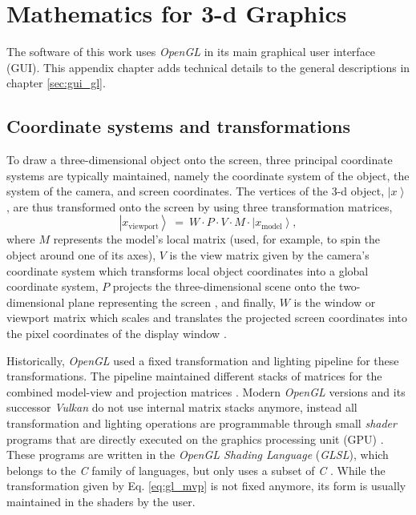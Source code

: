 %
%

\chapter{Mathematics for 3-d Graphics}
\label{ch:gl}

The software of this work uses \textit{OpenGL} \cite{web_OpenGL} in its main graphical user interface (GUI).
This appendix chapter adds technical details to the general descriptions in chapter \ref{sec:gui_gl}.



\section{Coordinate systems and transformations}

To draw a three-dimensional object onto the screen, three principal coordinate systems are typically maintained,
namely the coordinate system of the object, the system of the camera, and screen coordinates.
The vertices of the 3-d object, $\left|x\right>$ , are thus transformed onto the screen by using three
transformation matrices,
\begin{equation}
	\boxed{\left|x_{\mathrm{viewport}}\right> \ =\ W \cdot P \cdot V \cdot  M \cdot  \left| x_{\mathrm{model}} \right>,}
	\label{eq:gl_mvp}
\end{equation}
where $M$ represents the model's local matrix (used, for example, to spin the object around one of its axes),
$V$ is the view matrix given by the camera's coordinate system which transforms local object coordinates into
a global coordinate system, $P$ projects the three-dimensional scene onto the two-dimensional plane
representing the screen \cite{web_gl_ortho, web_gl_perspective}, and finally, $W$ is the window or viewport 
matrix which scales and translates the projected screen coordinates into the pixel coordinates of the 
display window \cite{web_gl_viewport}.

Historically, \textit{OpenGL} used a fixed transformation and lighting pipeline \cite{wiki_gl_history} for
these transformations. The pipeline maintained different stacks of matrices for the combined model-view and
projection matrices \cite{web_gl_matrixmode}.
Modern \textit{OpenGL} \cite{web_OpenGL} versions and its successor \textit{Vulkan} \cite{web_Vulkan} do not 
use internal matrix stacks anymore, instead all transformation and lighting operations are programmable through 
small \textit{shader} programs that are directly executed on the graphics processing unit (GPU) \cite{wiki_gl_history}. 
These programs are written in the \textit{OpenGL Shading Language} (\textit{GLSL}), which belongs to the 
\textit{C} family of languages, but only uses a subset of \textit{C} \cite{wiki_glsl}.
While the transformation given by Eq. \ref{eq:gl_mvp} is not fixed anymore, its form is usually maintained
in the shaders by the user.

